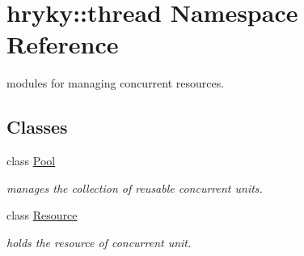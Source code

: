 \hypertarget{namespacehryky_1_1thread}{\section{hryky\-:\-:thread Namespace Reference}
\label{namespacehryky_1_1thread}
}


modules for managing concurrent resources.  


\subsection*{Classes}
\begin{DoxyCompactItemize}
\item 
class \hyperlink{classhryky_1_1thread_1_1_pool}{Pool}
\begin{DoxyCompactList}\small\item\em manages the collection of reusable concurrent units. \end{DoxyCompactList}\item 
class \hyperlink{classhryky_1_1thread_1_1_resource}{Resource}
\begin{DoxyCompactList}\small\item\em holds the resource of concurrent unit. \end{DoxyCompactList}\end{DoxyCompactItemize}
